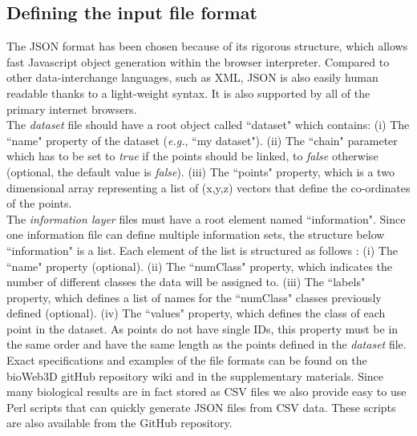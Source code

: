 \documentclass{bioinfo}
\begin{document}
\subsection{Defining the input file format}
The JSON format has been chosen because of its rigorous structure, which allows fast Javascript object generation within the browser interpreter. Compared to other data-interchange languages, such as XML, JSON is also easily human readable thanks to a light-weight syntax. It is also supported by all of the primary internet browsers.\\
The {\it{dataset}} file should have a root object called ``dataset" which contains: (i) The ``name" property of the dataset (\textit{e.g.}, ``my dataset"). (ii) The ``chain" parameter which has to be set to \textit{true} if the points should be linked, to \textit{false} otherwise (optional, the default value is \textit{false}). (iii) The ``points" property, which is a two dimensional array representing a list of (x,y,z) vectors that define the co-ordinates of the points.\\

The {\it{information layer}} files must have a root element named  ``information". Since one information file can define multiple information sets, the structure below ``information" is a list. Each element of the list is structured as follows : (i) The ``name" property (optional). (ii) The ``numClass" property, which indicates the number of different classes the data will be assigned to. (iii) The ``labels" property, which defines a list of names for the ``numClass" classes previously defined (optional). (iv) The ``values" property, which defines the class of each point in the dataset. As points do not have single IDs, this property must be in the same order and have the same length as the points defined in the {\it{dataset}} file.\\
Exact specifications and examples of the file formats can be found on the bioWeb3D gitHub repository wiki and in the supplementary materials. Since many biological results are in fact stored as CSV files we also provide easy to use Perl scripts that can quickly generate JSON files from CSV data. These scripts are also available from the GitHub repository.
\end{document}
